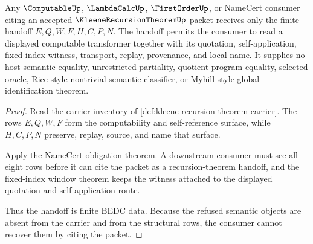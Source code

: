 \begin{theorem}
\label{thm:kleene-recursion-theorem-computable-handoff}
Any $\ComputableUp$, $\LambdaCalcUp$, $\FirstOrderUp$, or NameCert consumer citing an accepted $\KleeneRecursionTheoremUp$ packet receives only the finite handoff $E,Q,W,F,H,C,P,N$. The handoff permits the consumer to read a displayed computable transformer together with its quotation, self-application, fixed-index witness, transport, replay, provenance, and local name. It supplies no host semantic equality, unrestricted partiality, quotient program equality, selected oracle, Rice-style nontrivial semantic classifier, or Myhill-style global identification theorem.
\end{theorem}
\begin{proof}
Read the carrier inventory of \autoref{def:kleene-recursion-theorem-carrier}. The rows $E,Q,W,F$ form the computability and self-reference surface, while $H,C,P,N$ preserve, replay, source, and name that surface.

Apply the NameCert obligation theorem. A downstream consumer must see all eight rows before it can cite the packet as a recursion-theorem handoff, and the fixed-index window theorem keeps the witness attached to the displayed quotation and self-application route.

Thus the handoff is finite BEDC data. Because the refused semantic objects are absent from the carrier and from the structural rows, the consumer cannot recover them by citing the packet.
\end{proof}




